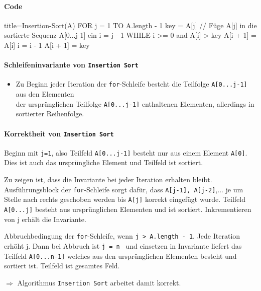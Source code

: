 \documentclass[
    ngerman,
    color=3b,
    dark_mode,
    load_common, %
    summary,
    boxarc,
]{rubos-tuda-template}
\begin{document}
\paragraph{Code}\mbox{}
\begin{codeBlock}[autogobble]{title=Insertion-Sort(A)}
    FOR j = 1 TO A.length - 1
      key = A[j]
      // Füge A[j] in die sortierte Sequenz A[0...j-1] ein
      i = j - 1
      WHILE i >= 0 and A[i] > key
          A[i + 1] = A[i]
          i = i - 1
      A[i + 1] = key
\end{codeBlock}

\paragraph{Schleifeninvariante von \texttt{Insertion Sort}}\label{insSortSiv}
\begin{itemize}
    \item Zu Beginn jeder Iteration der \texttt{for}-Schleife besteht die Teilfolge \texttt{A[0...j-1]} aus den Elementen \\
          der ursprünglichen Teilfolge \texttt{A[0...j-1]} enthaltenen Elementen, allerdings in sortierter Reihenfolge.
\end{itemize}

\paragraph{Korrektheit von \texttt{Insertion Sort}}
\begin{description}[leftmargin=3cm,itemsep=1em]
    \item [Initialisierung]
          Beginn mit \texttt{j=1}, also Teilfeld \texttt{A[0...j-1]} besteht nur aus einem Element \texttt{A[0]}. \\
          Dies ist auch das ursprüngliche Element und Teilfeld ist sortiert.
    \item [Fortsetzung]
          Zu zeigen ist, dass die Invariante bei jeder Iteration erhalten bleibt. Ausführungsblock der \texttt{for}-Schleife
          sorgt dafür, dass \texttt{A[j-1], A[j-2]},... je um Stelle nach rechts geschoben werden bis \texttt{A[j]} korrekt eingefügt wurde.
          Teilfeld \texttt{A[0...j]} besteht aus ursprünglichen Elementen und ist sortiert. Inkrementieren von j erhält die Invariante.
    \item [Terminierung]
          Abbruchbedingung der \texttt{for}-Schleife, wenn \texttt{j > A.length - 1}. Jede Iteration erhöht j.
          Dann bei Abbruch ist \texttt{j = n } und einsetzen in Invariante liefert das Teilfeld \texttt{A[0...n-1]}
          welches aus den ursprünglichen Elementen besteht und sortiert ist. Teilfeld ist gesamtes Feld.
\end{description}
$\Longrightarrow$ Algorithmus \texttt{Insertion Sort} arbeitet damit korrekt.
\clearpage
\end{document}
